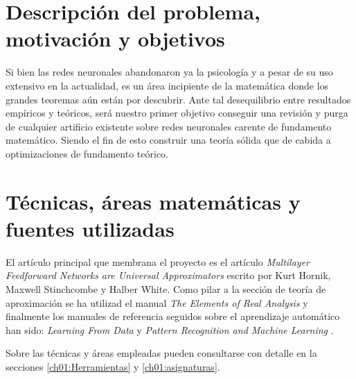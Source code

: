 \section*{Descripción del problema,  motivación y objetivos} 
Si bien las redes neuronales abandonaron ya la psicología 
y a pesar de su uso extensivo en la actualidad, es un área incipiente de la 
matemática donde los grandes teoremas aún están por descubrir. 
Ante tal desequilibrio entre resultados empíricos y teóricos,
 será 
nuestro primer objetivo conseguir una revisión y purga de cualquier artificio
 existente sobre redes neuronales carente de fundamento matemático. 
Siendo el fin de esto construir una teoría sólida que de cabida a 
optimizaciones de fundamento teórico.

\section*{Técnicas, áreas matemáticas y fuentes utilizadas}  

El artículo principal que membrana el proyecto es el artículo 
\textit{Multilayer Feedforward Networks are Universal Approximators} \cite{HORNIK1989359}
 escrito por Kurt Hornik, Maxwell Stinchcombe y Halber White. Como pilar a la 
 sección de teoría de aproximación se ha utilizad el manual \textit{The Elements of Real Analysis} \cite{the-elements-of-real-analysis} y finalmente los manuales de referencia seguidos sobre el aprendizaje automático han sido: 
 \textit{Learning From Data} \cite{MostafaLearningFromData} y \textit{Pattern Recognition and Machine Learning} \cite{BishopPaterRecognition}.

 Sobre las técnicas y áreas empleadas pueden consultarse con detalle en la secciones \ref{ch01:Herramientas} y \ref{ch01:asignaturas}.

